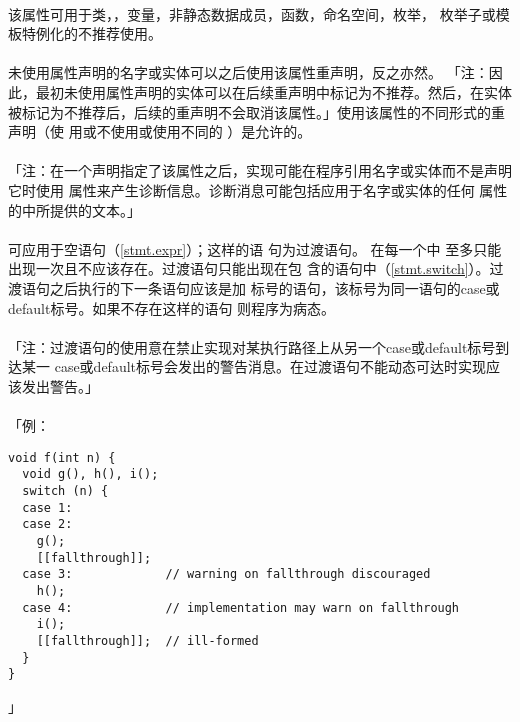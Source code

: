 \paragraph{}
该属性可用于类，，变量，非静态数据成员，函数，命名空间，枚举，
枚举子或模板特例化的不推荐使用。

\paragraph{}
未使用属性声明的名字或实体可以之后使用该属性重声明，反之亦然。
「注：因此，最初未使用属性声明的实体可以在后续重声明中标记为不推荐。然后，在实体
被标记为不推荐后，后续的重声明不会取消该属性。」使用该属性的不同形式的重声明（使
用或不使用或使用不同的
）是允许的。

\paragraph{}
「注：在一个声明指定了该属性之后，实现可能在程序引用名字或实体而不是声明它时使用
属性来产生诊断信息。诊断消息可能包括应用于名字或实体的任何
属性的中所提供的文本。」

\paragraph{}
 可应用于空语句（\ref{stmt.expr}）；这样的语
句为过渡语句。 在每一个中
至多只能出现一次且不应该存在。过渡语句只能出现在包
含的语句中（\ref{stmt.switch}）。过渡语句之后执行的下一条语句应该是加
标号的语句，该标号为同一语句的case或default标号。如果不存在这样的语句
则程序为病态。

\paragraph{}
「注：过渡语句的使用意在禁止实现对某执行路径上从另一个case或default标号到达某一
case或default标号会发出的警告消息。在过渡语句不能动态可达时实现应该发出警告。」

\paragraph{}
「例：
\begin{lstlisting}
void f(int n) {
  void g(), h(), i();
  switch (n) {
  case 1:
  case 2:
    g();
    [[fallthrough]];
  case 3:             // warning on fallthrough discouraged
    h();
  case 4:             // implementation may warn on fallthrough
    i();
    [[fallthrough]];  // ill-formed
  }
}
\end{lstlisting}」

